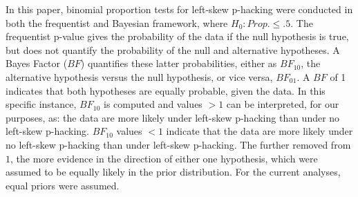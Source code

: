In this paper, binomial proportion tests for left-skew p-hacking were conducted in both the frequentist and Bayesian framework, where $H_0:Prop.\leq.5$. The frequentist p-value gives the probability of the data if the null hypothesis is true, but does not quantify the probability of the null and alternative hypotheses. A Bayes Factor ($BF$) quantifies these latter probabilities, either as $BF_{10}$, the alternative hypothesis versus the null hypothesis, or vice versa, $BF_{01}$. A $BF$ of 1 indicates that both hypotheses are equally probable, given the data. In this specific instance, $BF_{10}$ is computed and values $>1$ can be interpreted, for our purposes, as: the data are more likely under left-skew p-hacking than under no left-skew p-hacking. $BF_{10}$ values $<1$ indicate that the data are more likely under no left-skew p-hacking than under left-skew p-hacking. The further removed from $1$, the more evidence in the direction of either one hypothesis, which were assumed to be equally likely in the prior distribution. For the current analyses, equal priors were assumed.
  
  
